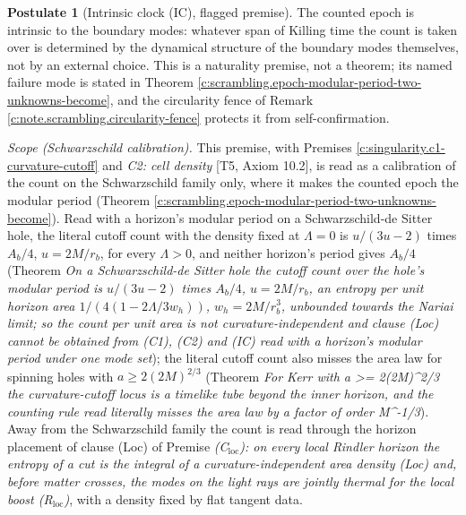 \documentclass[11pt]{article}
\theoremstyle{definition}
\newtheorem{postulate}[theorem]{Postulate}
\theoremstyle{plain}
\newcommand{\changedmark}[2]{\marginpar{\raggedright\scriptsize\color{#1}#2}}
\begin{document}
\begin{postulate}[Intrinsic clock (IC), flagged premise]\label{c:scrambling.intrinsic-clock-ic-flagged-premise}
\changedmark{BurntOrange}{changed since the deposit}
The counted epoch is intrinsic to the boundary modes: whatever span of Killing time the count is taken over is determined by the dynamical structure of the boundary modes themselves, not by an external choice. This is a naturality premise, not a theorem; its named failure mode is stated in Theorem \ref{c:scrambling.epoch-modular-period-two-unknowns-become}, and the circularity fence of Remark \ref{c:note.scrambling.circularity-fence} protects it from self-confirmation.

\emph{Scope (Schwarzschild calibration).} This premise, with Premises \ref{c:singularity.c1-curvature-cutoff} and \emph{C2: cell density} [T5, Axiom 10.2], is read as a calibration of the count on the Schwarzschild family only, where it makes the counted epoch the modular period (Theorem \ref{c:scrambling.epoch-modular-period-two-unknowns-become}). Read with a horizon's modular period on a Schwarzschild-de Sitter hole, the literal cutoff count with the density fixed at $\Lambda = 0$ is $u/(3u - 2)$ times $A_{b}/4$, $u = 2M/r_{b}$, for every $\Lambda > 0$, and neither horizon's period gives $A_{b}/4$ (Theorem \emph{On a Schwarzschild-de Sitter hole the cutoff count over the hole's modular period is $u/(3u - 2)$ times $A_{b}/4$, $u = 2M/r_{b}$, an entropy per unit horizon area $1/(4(1 - 2\Lambda/3w_{h}))$, $w_{h} = 2M/r_{b}^{3}$, unbounded towards the Nariai limit; so the count per unit area is not curvature-independent and clause (Loc) cannot be obtained from (C1), (C2) and (IC) read with a horizon's modular period under one mode set}); the literal cutoff count also misses the area law for spinning holes with $a \ge 2(2M)^{2/3}$ (Theorem \emph{For Kerr with a >= 2(2M)\^{}{2/3} the curvature-cutoff locus is a timelike tube beyond the inner horizon, and the counting rule read literally misses the area law by a factor of order M\^{}{-1/3}}). Away from the Schwarzschild family the count is read through the horizon placement of clause (Loc) of Premise \emph{(C$_{\mathrm{loc}}$): on every local Rindler horizon the entropy of a cut is the integral of a curvature-independent area density (Loc) and, before matter crosses, the modes on the light rays are jointly thermal for the local boost (R$_{\mathrm{loc}}$)}, with a density fixed by flat tangent data.
\end{postulate}
\end{document}
